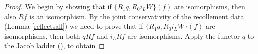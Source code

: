 \begin{proof}
We begin by showing that if $\{ R_1q, R_0i_LW\}(f)$ are isomorphisms, then also $Rf$ is an isomorphism.
By the joint conservativity of the recollement data (Lemma \ref{reflectsall}) we need to prove that  if $\{ R_1q, R_0i_LW\}(f)$ are isomorphisms, then both $qRf$ and $i_LRf$ are isomorphisms.
Apply the functor $q$ to the Jacob ladder (), to obtain


\end{proof}
